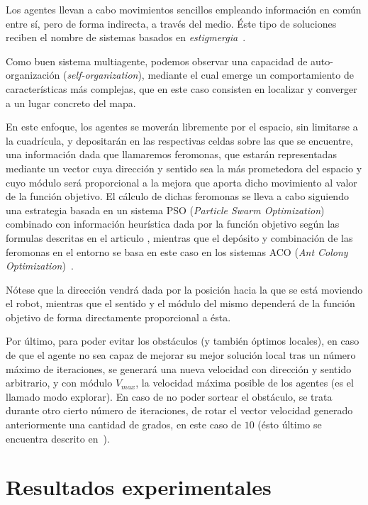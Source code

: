 \documentclass[runningheads]{llncs}
\begin{document}
    Los agentes llevan a cabo movimientos sencillos empleando información en común entre sí, pero de forma indirecta, a través del medio. Éste tipo de soluciones reciben el nombre de sistemas basados en \textit{estigmergia}~\cite{stigmergy}.

    Como buen sistema multiagente, podemos observar una capacidad de auto-organización (\textit{self-organization}), mediante el cual emerge un comportamiento de características más complejas, que en este caso consisten en localizar y converger a un lugar concreto del mapa.

    En este enfoque, los agentes se moverán libremente por el espacio, sin limitarse a la cuadrícula, y depositarán en las respectivas celdas sobre las que se encuentre, una información dada que llamaremos feromonas, que estarán representadas mediante un vector cuya dirección y sentido sea la más prometedora del espacio y cuyo módulo será proporcional a la mejora que aporta dicho movimiento al valor de la función objetivo. El cálculo de dichas feromonas se lleva a cabo siguiendo una estrategia basada en un sistema PSO (\textit{Particle Swarm Optimization})~\cite{PSO} combinado con información heurística dada por la función objetivo según las formulas descritas en el articulo \cite{initialPaper}, mientras que el depósito y combinación de las feromonas en el entorno se basa en este caso en los sistemas ACO (\textit{Ant Colony Optimization})~\cite{ACO}.

    Nótese que la dirección vendrá dada por la posición hacia la que se está moviendo el robot, mientras que el sentido y el módulo del mismo dependerá de la función objetivo de forma directamente proporcional a ésta.

    Por último, para poder evitar los obstáculos (y también óptimos locales), en caso de que el agente no sea capaz de mejorar su mejor solución local tras un número máximo de iteraciones, se generará una nueva velocidad con dirección y sentido arbitrario, y con módulo $V_{max}$, la velocidad máxima posible de los agentes (es el llamado modo explorar). En caso de no poder sortear el obstáculo, se trata durante otro cierto número de iteraciones, de rotar el vector velocidad generado anteriormente una cantidad de grados, en este caso de $10$ (ésto último se encuentra descrito en~\cite{referencedPaper}).


    \section{Resultados experimentales}
\end{document}
